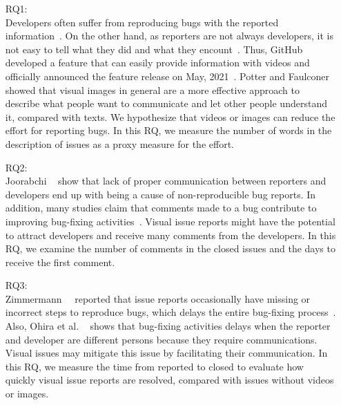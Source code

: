 \begin{itemize}
	\item[RQ1:] \textbf{\RQone{}}\\
	Developers often suffer from reproducing bugs with the reported information~\citep{DBLP:conf/sigsoft/ChaparroLZMPMBN17}\citep{DBLP:conf/icsm/0001KC20}\citep{zimmermann2010TSE}. 
	On the other hand, as reporters are not always developers, it is not easy to tell what they did and what they encount~\citep{DBLP:conf/sigsoft/ChaparroBLMMPPN19}. Thus, GitHub developed a feature that can easily provide information with videos and officially announced the feature release on May, 2021~\citep{github-video-blog}. Potter and Faulconer~\citep{POTTER1975} showed that visual images in general are a more effective approach to describe what people want to communicate and let other people understand it, compared with texts. 
	We hypothesize that videos or images can reduce the effort for reporting bugs. In this RQ, we measure the number of words in the description of issues as a proxy measure for the effort. 
	\item[RQ2:] \textbf{\RQtwo{}}\\
	Joorabchi \et~\citep{DBLP:conf/msr/JoorabchiMM14} show that lack of proper communication between reporters and developers end up with being a cause of non-reproducible bug reports. In addition, many studies claim that comments made to a bug contribute to improving bug-fixing activities~\citep{DBLP:conf/icse/GigerPG10}\citep{DBLP:conf/msr/Panjer07}\citep{zhang2012WCRE}.  Visual issue reports might have the potential to attract developers and receive many comments from the developers. In this RQ, we examine the number of comments in the closed issues and the days to receive the first comment.
	\item[RQ3:] \textbf{\RQthree{}}\\
	Zimmermann~\et~\citep{zimmermann2010TSE} reported that issue reports occasionally have missing or incorrect steps to reproduce bugs, which delays the entire bug-fixing process~\citep{github-video-blog}. Also, Ohira et al. ~\citep{DBLP:conf/icsm/OhiraHOM12} shows that bug-fixing activities delays when the reporter and developer are different persons because they require communications. Visual issues may mitigate this issue by facilitating their communication. In this RQ, we measure the time from reported to closed to evaluate how quickly visual issue reports are resolved, compared with issues without videos or images. 
\end{itemize}

